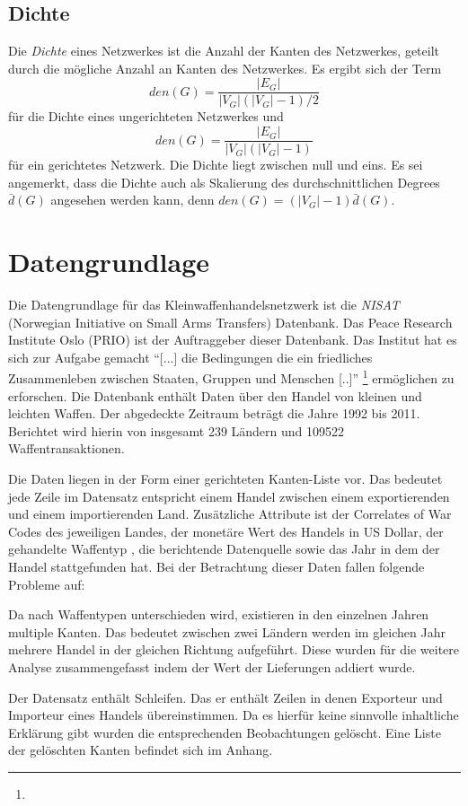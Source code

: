 \documentclass[a4paper,ngerman,oneside,titlepage,bibliography=totoc,11pt]{scrreprt}
\begin{document}
\section{Dichte}
Die \emph{Dichte} eines Netzwerkes ist die Anzahl der Kanten des Netzwerkes, geteilt durch die mögliche Anzahl an Kanten des Netzwerkes. Es ergibt sich der Term $$den(G) = \frac{|E_G|}{|V_G|(|V_G|-1)/2}$$ für die Dichte eines ungerichteten Netzwerkes und $$den(G) = \frac{|E_G|}{|V_G|(|V_G|-1)}$$ für ein gerichtetes Netzwerk. Die Dichte liegt zwischen null und eins. Es sei angemerkt, dass die Dichte auch als Skalierung des durchschnittlichen Degrees $\bar{d}(G)$ angesehen werden kann, denn $den(G) = (|V_G| - 1) \bar{d}(G)$.

\chapter{Datengrundlage}
Die Datengrundlage für das Kleinwaffenhandelsnetzwerk ist die \emph{NISAT} (Norwegian Initiative on Small Arms Transfers) Datenbank. Das Peace Research Institute Oslo (PRIO) ist der Auftraggeber dieser Datenbank. Das Institut hat es sich zur Aufgabe gemacht "`[...] die Bedingungen die ein friedliches Zusammenleben zwischen Staaten, Gruppen und Menschen [..]"' \footnote{} ermöglichen zu erforschen. Die Datenbank enthält Daten über den Handel von kleinen und leichten Waffen. Der abgedeckte Zeitraum beträgt die Jahre 1992 bis 2011. Berichtet wird hierin von insgesamt 239 Ländern und 109522 Waffentransaktionen.

Die Daten liegen in der Form einer gerichteten Kanten-Liste vor. Das bedeutet jede Zeile im Datensatz entspricht einem Handel zwischen einem exportierenden und einem importierenden Land. Zusätzliche Attribute ist der Correlates of War Codes des jeweiligen Landes, der monetäre Wert des Handels in US Dollar, der gehandelte Waffentyp , die berichtende Datenquelle sowie das Jahr in dem der Handel stattgefunden hat.
Bei der Betrachtung dieser Daten fallen folgende Probleme auf:

Da nach Waffentypen unterschieden wird, existieren in den einzelnen Jahren multiple Kanten. Das bedeutet zwischen zwei Ländern werden im gleichen Jahr mehrere Handel in der gleichen Richtung aufgeführt. Diese wurden für die weitere Analyse zusammengefasst indem der Wert der Lieferungen addiert wurde.

Der Datensatz enthält Schleifen. Das er enthält Zeilen in denen Exporteur und Importeur eines Handels übereinstimmen. Da es hierfür keine sinnvolle inhaltliche Erklärung gibt wurden die entsprechenden Beobachtungen gelöscht. Eine Liste der gelöschten Kanten befindet sich im Anhang.
\end{document}
